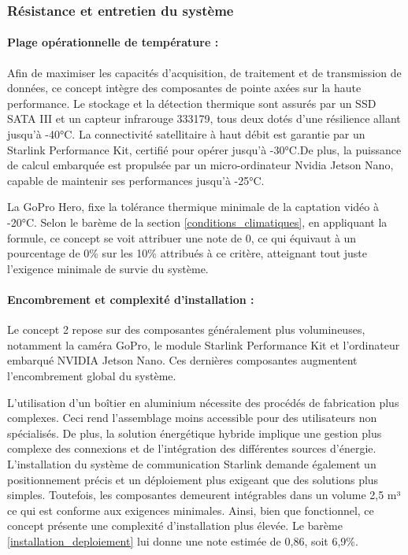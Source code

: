 \subsubsection{Résistance et entretien du système}

\paragraph{Plage opérationnelle de température :}
Afin de maximiser les capacités d'acquisition, de traitement et de transmission de données, ce concept intègre des composantes de pointe axées sur la haute performance.
Le stockage et la détection thermique sont assurés par un SSD SATA III et un capteur infrarouge 333179, tous deux dotés d'une résilience allant jusqu'à -40°C. La connectivité satellitaire à haut débit est garantie par un Starlink Performance Kit, certifié pour opérer jusqu'à -30°C.De plus, la puissance de calcul embarquée est propulsée par un micro-ordinateur Nvidia Jetson Nano, capable de maintenir ses performances jusqu'à -25°C. 

\bigskip
La GoPro Hero, fixe la tolérance thermique minimale de la captation vidéo à -20°C. Selon le barème de la section \ref{conditions_climatiques}, en appliquant la formule, ce concept se voit attribuer une note de 0, ce qui équivaut à un pourcentage de 0\% sur les 10\% attribués à ce critère, atteignant tout juste l'exigence minimale de survie du système. 

\paragraph{Encombrement et complexité d'installation :}
Le concept 2 repose sur des composantes généralement plus volumineuses, notamment la caméra GoPro, le module Starlink Performance Kit et l’ordinateur embarqué NVIDIA Jetson Nano. Ces dernières composantes augmentent l’encombrement global du système.

\bigskip
L’utilisation d’un boîtier en aluminium nécessite des procédés de fabrication plus complexes. Ceci rend l’assemblage moins accessible pour des utilisateurs non spécialisés. De plus, la solution énergétique hybride implique une gestion plus complexe des connexions et de l’intégration des différentes sources d’énergie. L’installation du système de communication Starlink demande également un positionnement précis et un déploiement plus exigeant que des solutions plus simples.  
Toutefois, les composantes demeurent intégrables dans un volume 2,5 m³ ce qui est conforme aux exigences minimales. Ainsi, bien que fonctionnel, ce concept présente une complexité d’installation plus élevée. Le barème \ref{installation_deploiement} lui donne une note estimée de 0,86, soit 6,9\%.


